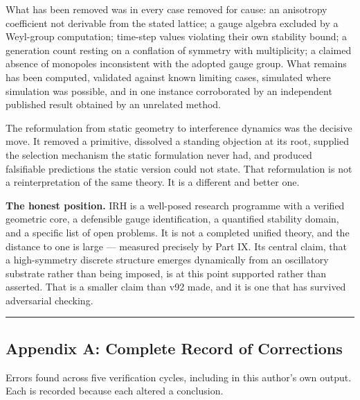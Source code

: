 \documentclass[a4paper,11pt]{article}
\begin{document}
What has been removed was in every case removed for cause: an anisotropy coefficient not derivable from the stated lattice; a gauge algebra excluded by a Weyl-group computation; time-step values violating their own stability bound; a generation count resting on a conflation of symmetry with multiplicity; a claimed absence of monopoles inconsistent with the adopted gauge group. What remains has been computed, validated against known limiting cases, simulated where simulation was possible, and in one instance corroborated by an independent published result obtained by an unrelated method.

The reformulation from static geometry to interference dynamics was the decisive move. It removed a primitive, dissolved a standing objection at its root, supplied the selection mechanism the static formulation never had, and produced falsifiable predictions the static version could not state. That reformulation is not a reinterpretation of the same theory. It is a different and better one.

\textbf{The honest position.} IRH is a well-posed research programme with a verified geometric core, a defensible gauge identification, a quantified stability domain, and a specific list of open problems. It is not a completed unified theory, and the distance to one is large — measured precisely by Part IX. Its central claim, that a high-symmetry discrete structure emerges dynamically from an oscillatory substrate rather than being imposed, is at this point supported rather than asserted. That is a smaller claim than v92 made, and it is one that has survived adversarial checking.

\medskip\hrule\medskip

\subsection*{Appendix A: Complete Record of Corrections}

Errors found across five verification cycles, including in this author's own output. Each is recorded because each altered a conclusion.
\end{document}
